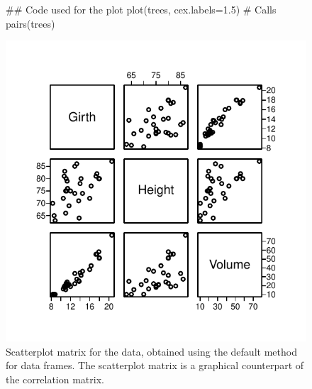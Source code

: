 \begin{figure}
\vspace*{-6pt}

\begin{minipage}[c]{0.55\linewidth}
\vspace*{6pt}

\begin{Schunk}
\begin{Sinput}
## Code used for the plot
plot(trees, cex.labels=1.5)
  # Calls pairs(trees)
\end{Sinput}
\end{Schunk}
\end{minipage}
\begin{minipage}[c]{0.465\linewidth}
\begin{Schunk}


\centerline{\includegraphics[width=\textwidth]{figs/03-plot-trees-1} }

\end{Schunk}
\vspace*{-15pt}

\end{minipage}
\caption{Scatterplot matrix for the  data, obtained
  using the default  method for data frames.  The
  scatterplot matrix is a graphical counterpart of the correlation
  matrix.\label{fig:trees}}
\end{figure}


